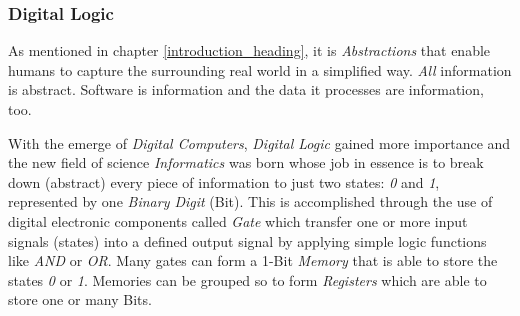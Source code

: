%
%
%
%
%
%
%

\subsubsection{Digital Logic}
\label{digital_logic_heading}

As mentioned in chapter \ref{introduction_heading}, it is \emph{Abstractions}
that enable humans to capture the surrounding real world in a simplified way.
\emph{All} information is abstract. Software is information and the data it
processes are information, too.

With the emerge of \emph{Digital Computers}, \emph{Digital Logic} gained more
importance and the new field of science \emph{Informatics} was born whose job
in essence is to break down (abstract) every piece of information to just two
states: \emph{0} and \emph{1}, represented by one \emph{Binary Digit} (Bit).
This is accomplished through the use of digital electronic components called
\emph{Gate} which transfer one or more input signals (states) into a defined
output signal by applying simple logic functions like \emph{AND} or \emph{OR}.
Many gates can form a 1-Bit \emph{Memory} that is able to store the states
\emph{0} or \emph{1}. Memories can be grouped so to form \emph{Registers}
\cite{hennessy} which are able to store one or many Bits.

